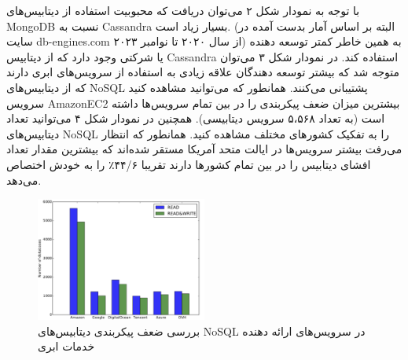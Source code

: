 \documentclass[10pt, a4paper]{article}
\begin{document}
\begin{LTR}
    \begin{table}[h]
        \centering
        \begin{RTL}
            \caption{تعداد سرویس‌های افشا شده NoSQL}
        \end{RTL}
    \end{table}
\end{LTR}

با توجه به نمودار شکل ۲ می‌توان دریافت که محبوبیت استفاده از دیتابیس‌های MongoDB
نسبت به Cassandra بسیار زیاد است. (البته بر اساس آمار بدست آمده در سایت
db-engines.com از سال ۲۰۲۰ تا نوامبر ۲۰۲۳) به همین خاطر کمتر توسعه دهنده یا
شرکتی وجود دارد که از دیتابیس Cassandra استفاده کند. در نمودار شکل ۳ می‌توان
متوجه شد که بیشتر توسعه دهندگان علاقه زیادی به استفاده از سرویس‌های ابری دارند
که از دیتابیس‌های NoSQL پشتیبانی می‌کنند. همانطور که می‌توانید مشاهده کنید سرویس
AmazonEC2 بیشترین میزان ضعف پیکربندی را در بین تمام سرویس‌ها داشته است (به تعداد
۵،۵۶۸ سرویس دیتابیسی). همچنین در نمودار شکل ۴ می‌توانید تعداد دیتابیس‌های NoSQL
را به تفکیک کشور‌های مختلف مشاهده کنید. همانطور که انتظار می‌رفت بیشتر سرویس‌ها
در ایالت متحد آمریکا مستقر شده‌اند  که بیشترین مقدار تعداد افشای دیتابیس را در
بین تمام کشور‌ها دارند تقریبا ۴۴/۶٪ را به خودش اختصاص می‌دهد.

\begin{figure}[H]
    \centering
    \includegraphics[width=0.5\textwidth]{res/b.png}
    \caption{بررسی ضعف پیکربندی دیتابیس‌های NoSQL در سرویس‌های ارائه دهنده خدمات ابری}
    \label{fig: diagram}
\end{figure}
\end{document}
